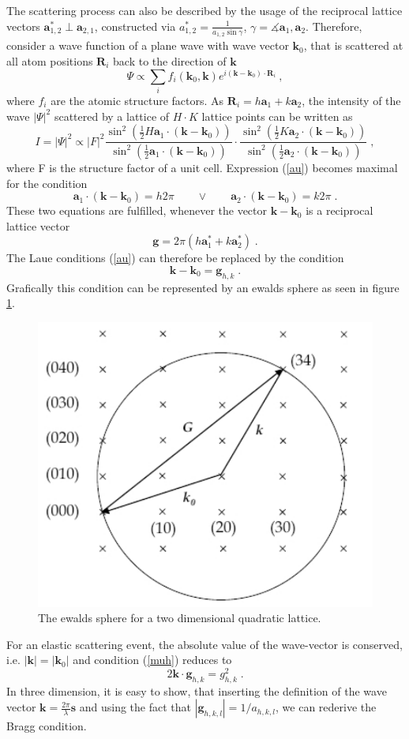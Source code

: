 \documentclass[a4paper]{scrartcl}
\numberwithin{equation}{section}
\numberwithin{figure}{section}
\numberwithin{table}{section}
\newcommand{\eq}[2]{\begin{equation}#1\label{#2}\end{equation}}
\newcommand{\Formel}[1]{(\ref{#1})}
\newcommand{\ve}[1]{\mathbf{ #1} }
\begin{document}
The scattering process can also be described by the usage of the reciprocal lattice vectors $\ve a_{1,2}^* \perp \ve a_{2,1}$, constructed via
$a_{1,2}^*=\frac{1}{a_{1,2} \sin \gamma} $, $\gamma = \measuredangle \ve a_1, \ve a_2 $. Therefore, consider a wave function of a plane wave with wave vector $\ve k_0$, that is scattered at all atom positions $\ve R_i$ back to the direction of $\ve k$ 
\eq{\Psi \propto \sum_{i} f_i(\ve k_0, \ve k) e^{i(\ve k - \ve k_0) \cdot \ve R_i} \ ,}{}
where $f_i$ are the atomic structure factors. As $\ve R_i=h \ve a_1 + k \ve a_2$, the intensity of the wave $|\Psi|^2$ scattered by a lattice of $H \cdot K$ lattice points can be written as
\eq{I=|\Psi|^2 \propto |F|^2 \frac{\sin^2 \left( \tfrac 1 2 H \ve a_1 \cdot (\ve k - \ve k_0) \right)}{\sin^2 \left( \tfrac 1 2 \ve a_1 \cdot ( \ve k - \ve k_0 ) \right)} \cdot \frac{\sin^2 \left( \tfrac 1 2 K \ve a_2 \cdot (\ve k - \ve k_0) \right)} {\sin^2 \left( \tfrac 1 2 \ve a_2 \cdot ( \ve k - \ve k_0 ) \right)} \; , } {au}
where F is the structure factor of a unit cell. Expression \Formel{au} becomes  maximal for the condition
\eq{\ve a_1 \cdot (\ve k - \ve k_0) = h 2 \pi \qquad \vee \qquad \ve a_2 \cdot (\ve k - \ve k_0) = k 2 \pi \;.}{}
These two equations are fulfilled, whenever the vector $\ve k - \ve k_0$ is a reciprocal lattice vector
\eq{\ve g = 2 \pi (h \ve a_1^{*} + k \ve a_2^*) \; .}{}
The Laue conditions \Formel{au} can therefore be replaced by the condition
\eq{\ve k - \ve k_0 =\ve g_{h,k} \;.}{muh}
Grafically this condition can be represented by an ewalds sphere as seen in figure \ref{fig:ewald}.
\begin{figure}
  \centering
   	\includegraphics[width=0.5\linewidth]{pic/ewald.pdf}
 		\caption{ \small The ewalds sphere for a two dimensional quadratic lattice.  } %
      \label{fig:ewald}
\end{figure}
For an elastic scattering event, the absolute value of the wave-vector is conserved, i.e. $|\ve k|=|\ve k_0|$ and condition \Formel{muh} reduces to
\eq{2\ve k \cdot \ve g_{h,k} = g_{h,k}^2 \; .}{}
In three dimension, it is easy to show, that inserting the definition of the wave vector $\ve k=\frac{2\pi}{\lambda} \ve s$ and using the fact that $|\ve g_{h,k,l}| = 1/a_{h,k,l}$, we can rederive the Bragg condition. 
\end{document}
